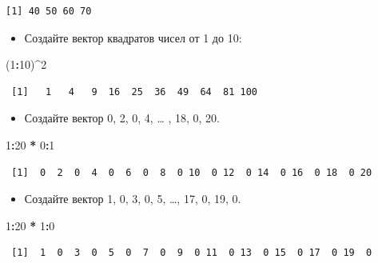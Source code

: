 \documentclass[
]{book}
\newenvironment{Shaded}{\begin{snugshade}}{\end{snugshade}}
\newcommand{\DecValTok}[1]{\textcolor[rgb]{0.00,0.00,0.81}{#1}}
\newcommand{\NormalTok}[1]{#1}
\newcommand{\OperatorTok}[1]{\textcolor[rgb]{0.81,0.36,0.00}{\textbf{#1}}}
\newcommand{\StringTok}[1]{\textcolor[rgb]{0.31,0.60,0.02}{#1}}
\providecommand{\tightlist}{%
  \setlength{\itemsep}{0pt}\setlength{\parskip}{0pt}}
\begin{document}
\begin{verbatim}
[1] 40 50 60 70
\end{verbatim}

\begin{itemize}
\tightlist
\item
  Создайте вектор квадратов чисел от 1 до 10:
\end{itemize}

\begin{Shaded}
\begin{Highlighting}[]
\NormalTok{(}\DecValTok{1}\OperatorTok{:}\DecValTok{10}\NormalTok{)}\OperatorTok{^}\DecValTok{2}
\end{Highlighting}
\end{Shaded}

\begin{verbatim}
 [1]   1   4   9  16  25  36  49  64  81 100
\end{verbatim}

\begin{itemize}
\tightlist
\item
  Создайте вектор 0, 2, 0, 4, \ldots{} , 18, 0, 20.
\end{itemize}

\begin{Shaded}
\begin{Highlighting}[]
\DecValTok{1}\OperatorTok{:}\DecValTok{20} \OperatorTok{*}\StringTok{ }\DecValTok{0}\OperatorTok{:}\DecValTok{1}
\end{Highlighting}
\end{Shaded}

\begin{verbatim}
 [1]  0  2  0  4  0  6  0  8  0 10  0 12  0 14  0 16  0 18  0 20
\end{verbatim}

\begin{itemize}
\tightlist
\item
  Создайте вектор 1, 0, 3, 0, 5, \ldots, 17, 0, 19, 0.
\end{itemize}

\begin{Shaded}
\begin{Highlighting}[]
\DecValTok{1}\OperatorTok{:}\DecValTok{20} \OperatorTok{*}\StringTok{ }\DecValTok{1}\OperatorTok{:}\DecValTok{0}
\end{Highlighting}
\end{Shaded}

\begin{verbatim}
 [1]  1  0  3  0  5  0  7  0  9  0 11  0 13  0 15  0 17  0 19  0
\end{verbatim}
\end{document}
